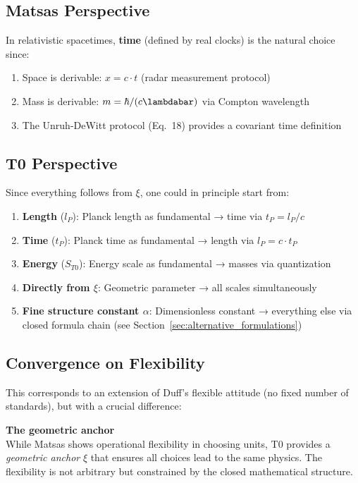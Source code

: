 	\subsection{Matsas Perspective}
	
	In relativistic spacetimes, \textbf{time} (defined by real clocks) is the natural choice since:
	\begin{enumerate}
		\item Space is derivable: $x = c \cdot t$ (radar measurement protocol)
		\item Mass is derivable: $m = \hbar / (c \lambdabar)$ via Compton wavelength
		\item The Unruh-DeWitt protocol (Eq.~18) provides a covariant time definition
	\end{enumerate}
	
	\subsection{T0 Perspective}
	
	Since everything follows from $\xi$, one could in principle start from:
	
	\begin{enumerate}
		\item \textbf{Length} ($l_P$): Planck length as fundamental → time via $t_P = l_P/c$
		\item \textbf{Time} ($t_P$): Planck time as fundamental → length via $l_P = c \cdot t_P$
		\item \textbf{Energy} ($S_{T0}$): Energy scale as fundamental → masses via quantization
		\item \textbf{Directly from $\xi$}: Geometric parameter → all scales simultaneously
		\item \textbf{Fine structure constant $\alpha$}: Dimensionless constant → everything else via closed formula chain (see Section~\ref{sec:alternative_formulations})
	\end{enumerate}
	
	\subsection{Convergence on Flexibility}
	
	This corresponds to an extension of Duff's flexible attitude (no fixed number of standards), but with a crucial difference:
	
	\begin{insight}
		\textbf{The geometric anchor}\\
		While Matsas shows operational flexibility in choosing units, T0 provides a \emph{geometric anchor} $\xi$ that ensures all choices lead to the same physics. The flexibility is not arbitrary but constrained by the closed mathematical structure.
	\end{insight}
	
